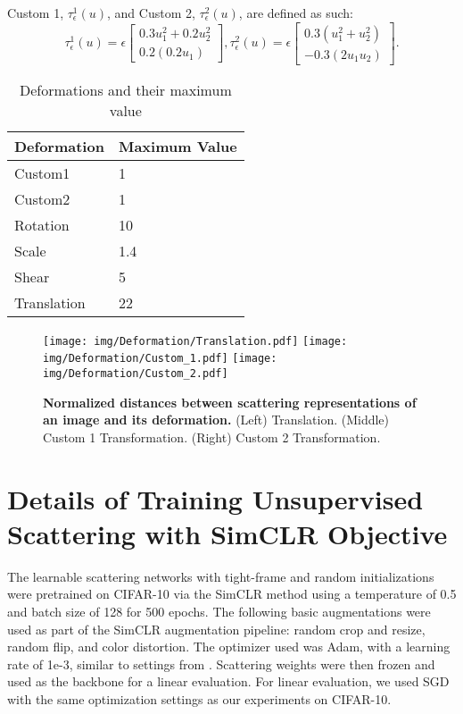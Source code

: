 \documentclass[10pt,twocolumn,letterpaper]{article}
\begin{document}
Custom 1, $\tau^{1}_\epsilon(u) $, and Custom 2, $\tau^{2}_\epsilon(u)$, are defined as such:
$$
\tau^{1}_\epsilon(u) = \epsilon\begin{bmatrix}0.3u_1^2 + 0.2u_2^2 \\ 0.2(0.2u_1)\end{bmatrix}, \tau^{2}_\epsilon(u) = \epsilon\begin{bmatrix}0.3 (u_1^2 + u_2^2) \\ -0.3(2u_1 u_2)\end{bmatrix}.$$

\begin{table}[H]
    \caption{Deformations and their maximum value\vspace{-10pt}}
    \centering
    \small
    
    \label{table:deformations}
      \fontsize{10}{10}\selectfont 
    \begin{tabular}{ll}
             \hline
          Deformation & Maximum Value\\
            \hline
           Custom1 & 1 \\
           Custom2 & 1 \\
           Rotation & 10 \\
           Scale & 1.4 \\
           Shear & 5 \\
           Translation & 22 \\
\end{tabular}
\end{table}
\begin{figure}[H]
    \centering
    \texttt{[image: img/Deformation/Translation.pdf]}
    \texttt{[image: img/Deformation/Custom\_1.pdf]}
    \texttt{[image: img/Deformation/Custom\_2.pdf]}
    \vspace{-10pt}
    \caption{\textbf{Normalized distances between scattering representations of an image and its deformation.} (Left) Translation. (Middle) Custom 1 Transformation. (Right) Custom 2 Transformation. }\label{fig:defo-appendix}
\end{figure}







\section{Details of Training Unsupervised Scattering with SimCLR Objective}
\label{appendix:unsup}
The learnable scattering networks with tight-frame and random initializations were pretrained on CIFAR-10 via the SimCLR method using a temperature of 0.5 and batch size of 128 for 500 epochs. The following basic augmentations were used as part of the SimCLR augmentation pipeline: random crop and resize, random flip, and color distortion. The optimizer used was Adam, with a learning rate of 1e-3, similar to settings from \cite{chen2020simple}. Scattering weights were then frozen and used as the backbone for a linear evaluation. For linear evaluation, we used SGD with the same optimization settings as our experiments on CIFAR-10.
\end{document}
